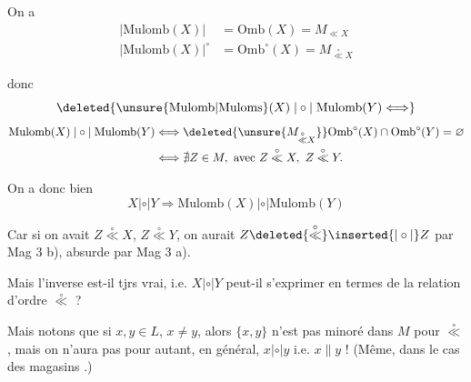 On a
\[
\begin{aligned}
|\mathrm{Mulomb}(X)|&=\mathrm{Omb}(X)=M_{\ll X}\\
|\mathrm{Mulomb}(X)|^\circ&=\mathrm{Omb}^\circ(X)=M_{\overset{\circ}{\ll}X}
\end{aligned}
\]

 donc
\[
\deleted{\unsure{\mathrm{Mulomb}|\mathrm{Muloms}}(X)\mathrel{|\circ|}\mathrm{Mulomb}(Y)\Longleftrightarrow}
\]
\[
\begin{aligned}
\mathrm{Mulomb}(X)\mathrel{|\circ|}\mathrm{Mulomb}(Y)&\Longleftrightarrow\deleted{\unsure{M_{\overset{\circ}{\ll}X}}}\mathrm{Omb}^\circ(X)\cap\mathrm{Omb}^\circ(Y)=\varnothing\\
&\Longleftrightarrow\nexists Z\in M,\text{ avec }Z\overset{\circ}{\ll}X,\ Z\overset{\circ}{\ll}Y.
\end{aligned}
\]

On a donc bien
\[
X\mathrel{|\circ|}Y\Longrightarrow\mathrm{Mulomb}(X)\mathrel{|\circ|}\mathrm{Mulomb}(Y)
\]

Car si on avait $Z\overset{\circ}{\ll}X$, $Z\overset{\circ}{\ll}Y$, on aurait $Z\deleted{\overset{\circ}{\ll}}\inserted{\mathrel{|\circ|}}Z$ par Mag 3 b), absurde par Mag 3 a).

Mais l'inverse est-il tjrs vrai, i.e. $X\mathrel{|\circ|}Y$ peut-il s'exprimer en termes de la relation d'ordre $\overset{\circ}{\ll}$ ?

 

Mais notons que si $x,y\in L$, $x\ne y$, alors $\{x,y\}$ n'est pas minoré dans $M$ pour $\overset{\circ}{\ll}$, mais on n'aura pas pour autant, en général, $x\mathrel{|\circ|}y$ i.e. $x\parallel y$ ! (Même, dans le cas des magasins .)


